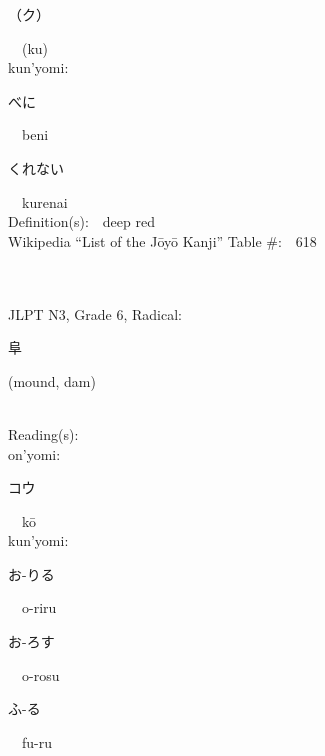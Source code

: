 \begin{multicols}{2}
{\hspace*{2em}}{\begin{CJK}{UTF8}{min} （ク） \end{CJK}}\ \ (ku)\ \ \\
{\hspace*{1em}}kun'yomi:\ \ \\
{\hspace*{2em}}{\begin{CJK}{UTF8}{min} べに \end{CJK}}\ \ beni\ \ \\
{\hspace*{2em}}{\begin{CJK}{UTF8}{min} くれない \end{CJK}}\ \ kurenai\ \ \\
Definition(s):\ \ deep red \\
Wikipedia ``List of the J\=oy\=o Kanji'' Table \#:\ \ 618 \\
\ \ \\
{\fontsize{34pt}{40pt}  }\ \ \\  %
{JLPT N3, Grade 6, Radical:\ \ {\begin{CJK}{UTF8}{min} 阜 \end{CJK}} (mound, dam) } \\
Reading(s):\ \ \\
{\hspace*{1em}}on'yomi:\ \ \\
{\hspace*{2em}}{\begin{CJK}{UTF8}{min} コウ \end{CJK}}\ \ k\=o\ \ \\
{\hspace*{1em}}kun'yomi:\ \ \\
{\hspace*{2em}}{\begin{CJK}{UTF8}{min} お-りる \end{CJK}}\ \ o-riru\ \ \\
{\hspace*{2em}}{\begin{CJK}{UTF8}{min} お-ろす \end{CJK}}\ \ o-rosu\ \ \\
{\hspace*{2em}}{\begin{CJK}{UTF8}{min} ふ-る \end{CJK}}\ \ fu-ru\ \ \\

\end{multicols}
